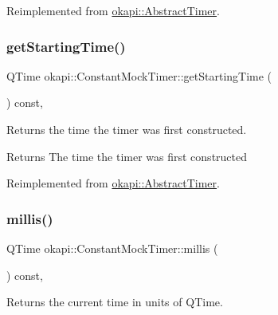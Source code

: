 Reimplemented from \mbox{\hyperlink{classokapi_1_1AbstractTimer_ac681cdd9a5147df0b796e9af836502c8}{okapi\+::\+Abstract\+Timer}}.

\mbox{\label{classokapi_1_1ConstantMockTimer_a1b0681828c4a29389b1179acee2850d8}} 
\subsubsection{\texorpdfstring{getStartingTime()}{getStartingTime()}}
{\footnotesize\ttfamily Q\+Time okapi\+::\+Constant\+Mock\+Timer\+::get\+Starting\+Time (\begin{DoxyParamCaption}{ }\end{DoxyParamCaption}) const\hspace{0.3cm}{\ttfamily [override]}, {\ttfamily [virtual]}}



Returns the time the timer was first constructed. 

\begin{DoxyReturn}{Returns}
The time the timer was first constructed 
\end{DoxyReturn}


Reimplemented from \mbox{\hyperlink{classokapi_1_1AbstractTimer_a4707dcc563e750ee491918d7c5755bc3}{okapi\+::\+Abstract\+Timer}}.

\mbox{\label{classokapi_1_1ConstantMockTimer_a9d392210167523ca4f8cf849f9746a08}} 
\subsubsection{\texorpdfstring{millis()}{millis()}}
{\footnotesize\ttfamily Q\+Time okapi\+::\+Constant\+Mock\+Timer\+::millis (\begin{DoxyParamCaption}{ }\end{DoxyParamCaption}) const\hspace{0.3cm}{\ttfamily [override]}, {\ttfamily [virtual]}}



Returns the current time in units of Q\+Time. 

